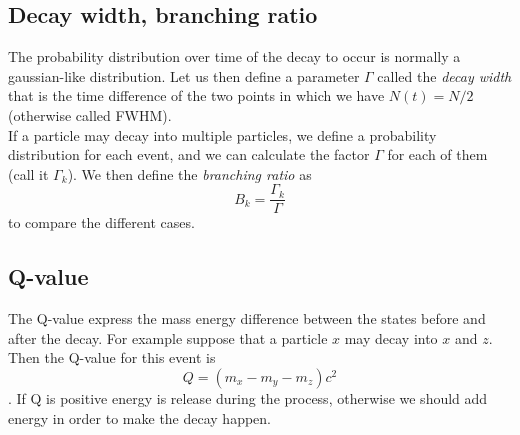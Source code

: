 \subsection*{Decay width, branching ratio}
The probability distribution over time of the decay to occur is normally a gaussian-like distribution.
Let us then define a parameter $\Gamma$ called the \emph{decay width} that is the time difference
of the two points in which we have $N(t) = N/2$ (otherwise called FWHM). \\
If a particle may decay into multiple particles, we define a probability distribution for each 
event, and we can calculate the factor $\Gamma$ for each of them (call it $\Gamma_k$). We then define the
\emph{branching ratio} as $$B_k = \frac{\Gamma_k}{\Gamma}$$ to compare the different cases.

\subsection*{Q-value}
The Q-value express the mass energy difference between the states before and after the decay.
For example suppose that a particle $x$ may decay into $x$ and $z$. Then the Q-value for this event
is $$Q = \left(m_x - m_y - m_z\right) c^2$$.
If Q is positive energy is release during the process, otherwise we should add energy in order to 
make the decay happen.